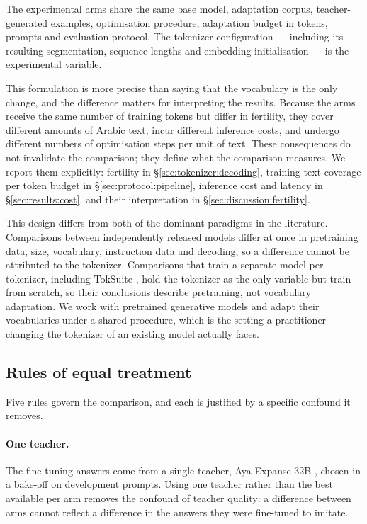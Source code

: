 \documentclass[a4paper,fleqn]{cas-sc}
\begin{document}
The experimental arms share the same base model, adaptation corpus, teacher-generated examples, optimisation procedure, adaptation budget in tokens, prompts and evaluation protocol. The tokenizer configuration --- including its resulting segmentation, sequence lengths and embedding initialisation --- is the experimental variable.

This formulation is more precise than saying that the vocabulary is the only change, and the difference matters for interpreting the results. Because the arms receive the same number of training tokens but differ in fertility, they cover different amounts of Arabic text, incur different inference costs, and undergo different numbers of optimisation steps per unit of text. These consequences do not invalidate the comparison; they define what the comparison measures. We report them explicitly: fertility in \S\ref{sec:tokenizer:decoding}, training-text coverage per token budget in \S\ref{sec:protocol:pipeline}, inference cost and latency in \S\ref{sec:results:cost}, and their interpretation in \S\ref{sec:discussion:fertility}.

This design differs from both of the dominant paradigms in the literature. Comparisons between independently released models differ at once in pretraining data, size, vocabulary, instruction data and decoding, so a difference cannot be attributed to the tokenizer. Comparisons that train a separate model per tokenizer, including TokSuite \citep{altintas2025toksuite}, hold the tokenizer as the only variable but train from scratch, so their conclusions describe pretraining, not vocabulary adaptation. We work with pretrained generative models and adapt their vocabularies under a shared procedure, which is the setting a practitioner changing the tokenizer of an existing model actually faces.

\subsection{Rules of equal treatment}
\label{sec:protocol:rules}

Five rules govern the comparison, and each is justified by a specific confound it removes.

\paragraph{One teacher.} The fine-tuning answers come from a single teacher, Aya-Expanse-32B \citep{dang2024aya}, chosen in a bake-off on development prompts. Using one teacher rather than the best available per arm removes the confound of teacher quality: a difference between arms cannot reflect a difference in the answers they were fine-tuned to imitate.
\end{document}

